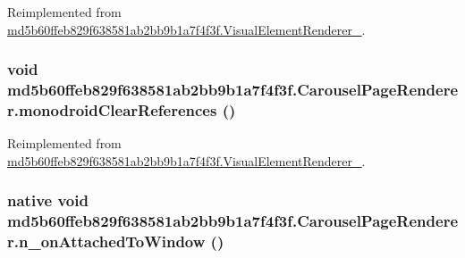 Reimplemented from \hyperlink{classmd5b60ffeb829f638581ab2bb9b1a7f4f3f_1_1_visual_element_renderer__1_321b2967faff34b0f7971f55915f583e}{md5b60ffeb829f638581ab2bb9b1a7f4f3f.VisualElementRenderer\_}.\hypertarget{classmd5b60ffeb829f638581ab2bb9b1a7f4f3f_1_1_carousel_page_renderer_e1977d178a6be8e92ddec489238ad42a}{
\subsubsection[{monodroidClearReferences}]{\setlength{\rightskip}{0pt plus 5cm}void md5b60ffeb829f638581ab2bb9b1a7f4f3f.CarouselPageRenderer.monodroidClearReferences ()}}
\label{classmd5b60ffeb829f638581ab2bb9b1a7f4f3f_1_1_carousel_page_renderer_e1977d178a6be8e92ddec489238ad42a}




Reimplemented from \hyperlink{classmd5b60ffeb829f638581ab2bb9b1a7f4f3f_1_1_visual_element_renderer__1_4a1c180026d8eab71549e47b7de4b9b8}{md5b60ffeb829f638581ab2bb9b1a7f4f3f.VisualElementRenderer\_}.\hypertarget{classmd5b60ffeb829f638581ab2bb9b1a7f4f3f_1_1_carousel_page_renderer_67fa6f1acff5e8db91344ca99760b07f}{
\subsubsection[{n\_\-onAttachedToWindow}]{\setlength{\rightskip}{0pt plus 5cm}native void md5b60ffeb829f638581ab2bb9b1a7f4f3f.CarouselPageRenderer.n\_\-onAttachedToWindow ()}}
\label{classmd5b60ffeb829f638581ab2bb9b1a7f4f3f_1_1_carousel_page_renderer_67fa6f1acff5e8db91344ca99760b07f}


